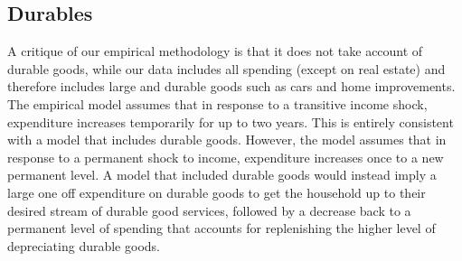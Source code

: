 \documentclass[titlepage]{\econtex}\newcommand{\texname}{ConsumptionHeterogeneity}
\begin{document}
\subsection{Durables} \label{durables}
A critique of our empirical methodology is that it does not take account of durable goods, while our data includes all spending (except on real estate) and therefore includes large and durable goods such as cars and home improvements. The empirical model assumes that in response to a transitive income shock, expenditure increases temporarily for up to two years. This is entirely consistent with a model that includes durable goods. However, the model assumes that in response to a permanent shock to income, expenditure increases once to a new permanent level. A model that included durable goods would instead imply a large one off expenditure on durable goods to get the household up to their desired stream of durable good services, followed by a decrease back to a permanent level of spending that accounts for replenishing the higher level of depreciating durable goods.
\end{document}

